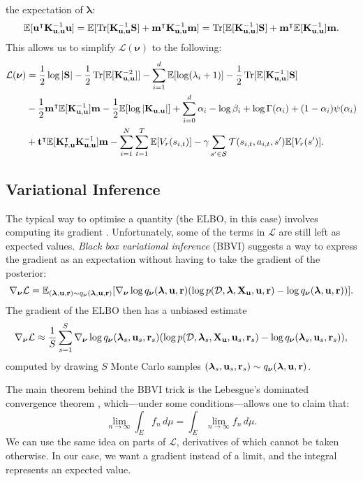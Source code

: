 \documentclass{mprop}
\theoremstyle{definition}
\DeclareMathOperator{\Tr}{Tr}
\begin{document}
the expectation of $\bm\lambda$:
\[ \mathbb{E}[\mathbf{u}^\intercal\Kuu^{-1}\mathbf{u}] =
  \mathbb{E}[\Tr[\Kuu^{-1}\mathbf{S}] +
  \mathbf{m}^\intercal\Kuu^{-1}\mathbf{m}] =
  \Tr[\mathbb{E}[\Kuu^{-1}]\mathbf{S}] +
  \mathbf{m}^\intercal\mathbb{E}[\Kuu^{-1}]\mathbf{m}. \]
This allows us to simplify $\mathcal{L}(\bm\nu)$ to the following:
\begin{align*}
  \mathcal{L}(\bm\nu) &= \frac{1}{2}\log|\mathbf{S}| - \frac{1}{2}\Tr[\mathbb{E}[\Kuu^{-2}]] - \sum_{i=1}^d \mathbb{E}[\log(\lambda_i + 1)] - \frac{1}{2}\Tr[\mathbb{E}[\Kuu^{-1}]\mathbf{S}] \\
  &- \frac{1}{2}\mathbf{m}^\intercal\mathbb{E}[\Kuu^{-1}]\mathbf{m} - \frac{1}{2}\mathbb{E}[\log|\Kuu|] + \sum_{i=0}^d \alpha_i - \log\beta_i + \log\Gamma(\alpha_i) + (1 - \alpha_i)\psi(\alpha_i) \\
  &+ \mathbf{t}^\intercal\mathbb{E}[\Kru^\intercal\Kuu^{-1}]\mathbf{m} - \sum_{i=1}^N \sum_{t=1}^T \mathbb{E}[V_r(s_{i,t})] - \gamma\sum_{s' \in \mathcal{S}} \mathcal{T}(s_{i,t}, a_{i,t}, s')\mathbb{E}[V_r(s')]. \\
\end{align*}

\subsection{Variational Inference} \label{vi_algs}

The typical way to optimise a quantity (the ELBO, in this case) involves
computing its gradient \cite{blei2017variational}. Unfortunately, some of the
terms in $\mathcal{L}$ are still left as expected values. \emph{Black box
  variational inference} (BBVI) \cite{DBLP:conf/aistats/RanganathGB14} suggests
a way to express the gradient as an expectation without having to take the
gradient of the posterior:
\[ \nabla_{\bm\nu} \mathcal{L} = \mathbb{E}_{(\bm\lambda, \mathbf{u}, \mathbf{r}) \sim q_{\bm\nu}(\bm\lambda, \mathbf{u}, \mathbf{r})}[\nabla_{\bm\nu} \log q_{\bm\nu}(\bm\lambda, \mathbf{u}, \mathbf{r})
  (\log p(\mathcal{D}, \bm\lambda, \mathbf{X_u}, \mathbf{u}, \mathbf{r}) - \log q_{\bm\nu}(\bm\lambda, \mathbf{u}, \mathbf{r}))]. \]
The gradient of the ELBO then has a unbiased estimate
\[ \nabla_{\bm\nu} \mathcal{L} \approx \frac{1}{S} \sum_{s=1}^S
  \nabla_{\bm\nu} \log q_{\bm\nu}(\bm\lambda_s, \mathbf{u}_s, \mathbf{r}_s) (\log p(\mathcal{D}, \bm\lambda_s, \mathbf{X_u}, \mathbf{u}_s, \mathbf{r}_s) - \log
  q_{\bm\nu}(\bm\lambda_s, \mathbf{u}_s, \mathbf{r}_s)), \]
computed by drawing $S$ Monte Carlo samples $(\bm\lambda_s, \mathbf{u}_s,
\mathbf{r}_s) \sim q_{\bm\nu}(\bm\lambda, \mathbf{u}, \mathbf{r})$.

The main theorem behind the BBVI trick is the Lebesgue's dominated convergence
theorem \cite{royden1988real}, which---under some conditions---allows one to
claim that:
\[ \lim_{n \to \infty} \int_E f_n\,d\mu = \int_E \lim_{n \to \infty}
  f_n\,d\mu. \]
We can use the same idea on parts of $\mathcal{L}$, derivatives of which cannot
be taken otherwise. In our case, we want a gradient instead of a limit, and the
integral represents an expected value.
\end{document}
